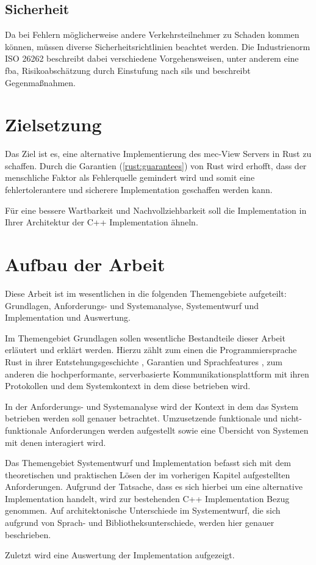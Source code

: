 \subsection{Sicherheit}
Da bei Fehlern möglicherweise andere Verkehrsteilnehmer zu Schaden kommen können, müssen diverse Sicherheitsrichtlinien beachtet werden. Die Industrienorm ISO 26262 beschreibt dabei verschiedene Vorgehensweisen,
unter anderem eine \gls{fba}, Risikoabschätzung durch Einstufung nach \glspl{sil} und beschreibt Gegenmaßnahmen.


\section{Zielsetzung}

Das Ziel ist es, eine alternative Implementierung des \gls{mec}-View Servers in Rust zu schaffen.
Durch die Garantien (\autoref{rust:guarantees}) von Rust wird erhofft, dass der menschliche Faktor als Fehlerquelle gemindert wird und somit eine fehlertolerantere und sicherere Implementation geschaffen werden kann.

 Für eine bessere Wartbarkeit und Nachvollziehbarkeit soll die Implementation in Ihrer Architektur der C++ Implementation ähneln.


\section{Aufbau der Arbeit}

Diese Arbeit ist im wesentlichen in die folgenden Themengebiete aufgeteilt: Grundlagen, Anforderungs- und Systemanalyse, Systementwurf und Implementation und Auswertung.

Im Themengebiet Grundlagen sollen wesentliche Bestandteile dieser Arbeit erläutert und erklärt werden.
Hierzu zählt zum einen die Programmiersprache Rust in ihrer Entstehungsgeschichte , Garantien   und Sprachfeatures , zum anderen die hochperformante, serverbasierte Kommunikationsplattform mit ihren Protokollen  und dem Systemkontext in dem diese betrieben wird.

In der Anforderungs- und Systemanalyse wird der Kontext in dem das System betrieben werden soll genauer betrachtet. Umzusetzende funktionale und nicht-funktionale Anforderungen werden aufgestellt sowie eine Übersicht von Systemen mit denen interagiert wird.

Das Themengebiet Systementwurf und Implementation befasst sich mit dem theoretischen und praktischen Lösen der im vorherigen Kapitel aufgestellten Anforderungen. Aufgrund der Tatsache, dass es sich hierbei
um eine alternative Implementation handelt, wird zur bestehenden C++ Implementation Bezug genommen.
Auf architektonische Unterschiede im Systementwurf, die sich aufgrund von Sprach- und Bibliotheksunterschiede, werden hier genauer beschrieben.

Zuletzt wird eine Auswertung der Implementation aufgezeigt. 